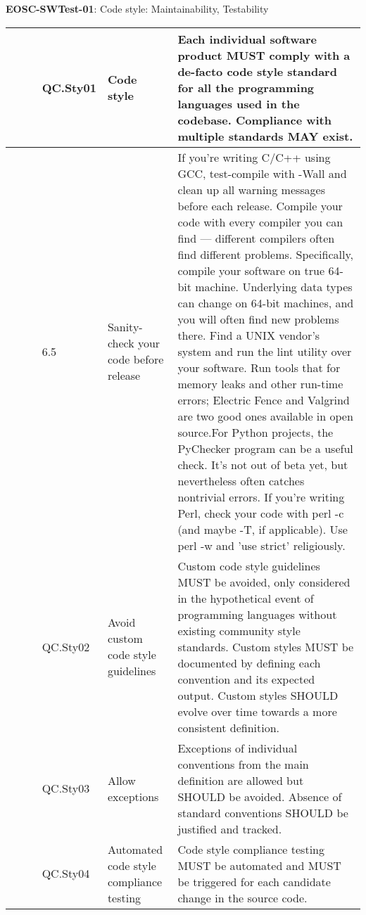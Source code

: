 \textbf{EOSC-SWTest-01}: Code style: Maintainability, Testability
\nopagebreak[4]
\begin{center}
    \tabletail{\hline}
    \tiny
    \begin{supertabular}{|p{0.10\linewidth}|p{0.10\linewidth}|p{0.20\linewidth}|p{0.60\linewidth}|} \hline
        \cite{orviz_set_2017} & QC.Sty01 & Code style & Each individual software product MUST comply with a de-facto code style standard for all the programming languages used in the codebase. Compliance with multiple standards MAY exist.\\ \hline
        \cite{raymond_software_2013} & 6.5 & Sanity-check your code before release & If you're writing C/C++ using GCC, test-compile with -Wall and clean up all warning messages before each release. Compile your code with every compiler you can find — different compilers often find different problems. Specifically, compile your software on true 64-bit machine. Underlying data types can change on 64-bit machines, and you will often find new problems there. Find a UNIX vendor's system and run the lint utility over your software. Run tools that for memory leaks and other run-time errors; Electric Fence and Valgrind are two good ones available in open source.For Python projects, the PyChecker program can be a useful check. It's not out of beta yet, but nevertheless often catches nontrivial errors. If you're writing Perl, check your code with perl -c (and maybe -T, if applicable). Use perl -w and 'use strict' religiously.\\ \hline
        \cite{orviz_set_2017} & QC.Sty02 & Avoid custom code style guidelines & Custom code style guidelines MUST be avoided, only considered in the hypothetical event of programming languages without existing community style standards. Custom styles MUST be documented by defining each convention and its expected output. Custom styles SHOULD evolve over time towards a more consistent definition.\\ \hline
        \cite{orviz_set_2017} & QC.Sty03 & Allow exceptions & Exceptions of individual conventions from the main definition are allowed but SHOULD be avoided. Absence of standard conventions SHOULD be justified and tracked.\\ \hline
        \cite{orviz_set_2017} & QC.Sty04 & Automated code style compliance testing & Code style compliance testing MUST be automated and MUST be triggered for each candidate change in the source code.\\ \hline
    \end{supertabular}
\end{center}

